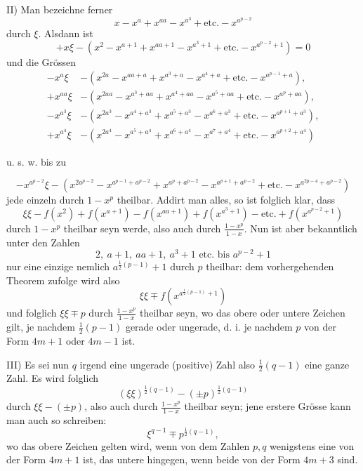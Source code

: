 II) Man bezeichne ferner
\[
x-x^a+x^{aa}-x^{a^3}+\text{etc.}-x^{a^{p-2}}
\]
\noindent durch $\xi$. Alsdann ist
\[
+x\xi-(x^2-x^{a+1}+x^{aa+1}-x^{a^3+1}+\text{etc.}-x^{a^{p-2}+1})=0
\]
\noindent und die Grössen
\begingroup\small
\[
\begin{aligned}
-x^a\xi&-(x^{2a}-x^{aa+a}+x^{a^3+a}-x^{a^4+a}+\text{etc.}-x^{a^{p-1}+a}),\\
+x^{aa}\xi&-(x^{2aa}-x^{a^3+aa}+x^{a^4+aa}-x^{a^5+aa}+\text{etc.}-x^{a^p+aa}),\\
-x^{a^3}\xi&-(x^{2a^3}-x^{a^4+a^3}+x^{a^5+a^3}-x^{a^6+a^3}+\text{etc.}-x^{a^{p+1}+a^3}),\\
+x^{a^4}\xi&-(x^{2a^4}-x^{a^5+a^4}+x^{a^6+a^4}-x^{a^7+a^4}+\text{etc.}-x^{a^{p+2}+a^4})
\end{aligned}
\]
\begin{center}u. s. w. bis zu\end{center}
\[
-x^{a^{p-2}}\xi-(x^{2a^{p-2}}-x^{a^{p-1}+a^{p-2}}+x^{a^p+a^{p-2}}-x^{a^{p+1}+a^{p-2}}+\text{etc.}-x^{a^{2p-4}+a^{p-2}})
\]
\endgroup
\noindent jede einzeln durch $1-x^p$ theilbar. Addirt man alles, so ist folglich klar, dass
\[
\xi\xi-f(x^2)+f(x^{a+1})-f(x^{aa+1})+f(x^{a^3+1})-\text{etc.}+f(x^{a^{p-2}+1})
\]
\noindent durch $1-x^p$ theilbar seyn werde, also auch durch $\frac{1-x^p}{1-x}$. Nun ist aber bekanntlich unter den Zahlen
\[
2,\ a+1,\ aa+1,\ a^3+1\text{ etc. bis }a^{p-2}+1
\]
\noindent nur eine einzige nemlich $a^{\frac12(p-1)}+1$ durch $p$ theilbar: dem vorhergehenden Theorem zufolge wird also
\[
\xi\xi\mp f(x^{a^{\frac12(p-1)}+1})
\]
\noindent und folglich $\xi\xi\mp p$ durch $\frac{1-x^p}{1-x}$ theilbar seyn, wo das obere oder untere Zeichen gilt, je nachdem $\tfrac12(p-1)$ gerade oder ungerade, d. i. je nachdem $p$ von der Form $4m+1$ oder $4m-1$ ist.
\clearpage

\par\indent III) Es sei nun $q$ irgend eine ungerade (positive) Zahl also $\tfrac12(q-1)$ eine ganze Zahl. Es wird folglich
\[
(\xi\xi)^{\frac12(q-1)}-(\pm p)^{\frac12(q-1)}
\]
\noindent durch $\xi\xi-(\pm p)$, also auch durch $\frac{1-x^p}{1-x}$ theilbar seyn; jene erstere Grösse kann man auch so schreiben:
\[
\xi^{q-1}\mp p^{\frac12(q-1)},
\]
\noindent wo das obere Zeichen gelten wird, wenn von dem Zahlen $p,q$ wenigstens eine von der Form $4m+1$ ist, das untere hingegen, wenn beide von der Form $4m+3$ sind.

